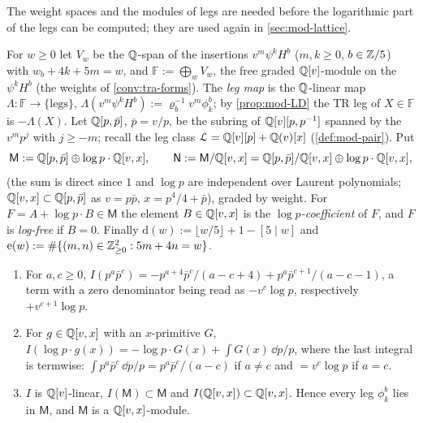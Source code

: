 The weight spaces and the modules of legs are needed before the logarithmic part of the legs can be computed; they are used again in \cref{sec:mod-lattice}.

\begin{defn}
\label{def:mod-weights}
For $w\geq 0$ let $V_w$ be the $\mathbb{Q}$-span of the insertions $v^m\psi^kH^b$ ($m,k\geq 0$, $b\in\mathbb{Z}/5$) with $w_b+4k+5m=w$, and $\mathbb F:=\bigoplus_wV_w$, the free graded $\mathbb{Q}[v]$-module on the $\psi^kH^b$ (the weights of \cref{conv:tra-forms}). The \emph{leg map} is the $\mathbb{Q}$-linear map $\Lambda\colon\mathbb F\to\{\text{legs}\}$, $\Lambda(v^m\psi^kH^b):=\varrho_b^{-1}v^m\phi^b_k$; by \cref{prop:mod-LD} the TR leg of $X\in\mathbb F$ is $-\Lambda(X)$. Let $\mathbb{Q}[p,\bar p]$, $\bar p=v/p$, be the subring of $\mathbb{Q}[v][p,p^{-1}]$ spanned by the $v^mp^j$ with $j\geq -m$; recall the leg class $\mathcal{L}=\mathbb{Q}[v][p]+\mathbb{Q}(v)[x]$ (\cref{def:mod-pair}). Put
\[
\mathsf M:=\mathbb{Q}[p,\bar p]\oplus\log p\cdot\mathbb{Q}[v,x],\qquad \mathsf N:=\mathsf M/\mathbb{Q}[v,x]=\mathbb{Q}[p,\bar p]/\mathbb{Q}[v,x]\oplus\log p\cdot\mathbb{Q}[v,x],
\]
(the sum is direct since $1$ and $\log p$ are independent over Laurent polynomials; $\mathbb{Q}[v,x]\subset\mathbb{Q}[p,\bar p]$ as $v=p\bar p$, $x=p^4/4+\bar p$), graded by weight. For $F=A+\log p\cdot B\in\mathsf M$ the element $B\in\mathbb{Q}[v,x]$ is the \emph{$\log p$-coefficient} of $F$, and $F$ is \emph{log-free} if $B=0$. Finally $\mathrm d(w):=\lfloor w/5\rfloor+1-[5\mid w]$ and $\mathrm e(w):=\#\{(m,n)\in\mathbb{Z}_{\geq 0}^2: 5m+4n=w\}$.
\end{defn}

\begin{lem}[Closure]
\label{lem:mod-closure}
\begin{enumerate}
\item For $a,c\geq 0$, $I(p^a\bar p^c)=-p^{a+4}\bar p^c/(a-c+4)+p^a\bar p^{c+1}/(a-c-1)$, a term with a zero denominator being read as $-v^c\log p$, respectively $+v^{c+1}\log p$.
\item For $g\in\mathbb{Q}[v,x]$ with an $x$-primitive $G$, $I(\log p\cdot g(x))=-\log p\cdot G(x)+\int G(x)\,\dd p/p$, where the last integral is termwise: $\int p^a\bar p^c\,\dd p/p=p^a\bar p^c/(a-c)$ if $a\neq c$ and $=v^c\log p$ if $a=c$.
\item $I$ is $\mathbb{Q}[v]$-linear, $I(\mathsf M)\subset\mathsf M$ and $I(\mathbb{Q}[v,x])\subset\mathbb{Q}[v,x]$. Hence every leg $\phi^b_k$ lies in $\mathsf M$, and $\mathsf M$ is a $\mathbb{Q}[v,x]$-module.
\end{enumerate}
\end{lem}

